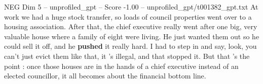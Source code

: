 \begin{textsample}{NEG Dim 5 – unprofiled\_gpt – Score -1.00 – unprofiled\_gpt/t001382\_gpt.txt}  \label{ex:f5_neg_009}
At work we had a huge stock transfer, so loads of council properties went over to a housing association.
After that, the chief executive really went after one big, very valuable house where a family of eight were living.
He just wanted them out so he could sell it off, and he \textbf{pushed} it really hard.
I had to step in and say, look, you can't just evict them like that, it ’s illegal, and that stopped it.
But that ’s the point : once those houses are in the hands of a chief executive instead of an elected councillor, it all becomes about the financial bottom line.

\end{textsample}
